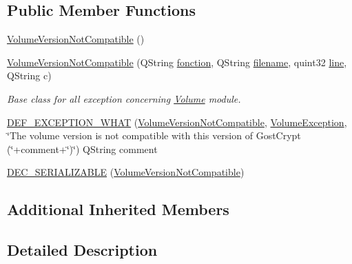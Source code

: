 \subsection*{Public Member Functions}
\begin{DoxyCompactItemize}
\item 
\hyperlink{class_gost_crypt_1_1_volume_1_1_volume_version_not_compatible_a89003c4e2f124de9c533203f30399028}{Volume\+Version\+Not\+Compatible} ()
\item 
\hyperlink{class_gost_crypt_1_1_volume_1_1_volume_version_not_compatible_a7779b958945f34a6e46d9414425c63c6}{Volume\+Version\+Not\+Compatible} (Q\+String \hyperlink{class_gost_crypt_1_1_gost_crypt_exception_a29b8c93d5efbb1ff369107385725a939}{fonction}, Q\+String \hyperlink{class_gost_crypt_1_1_gost_crypt_exception_a749a12375f4ba9d502623b99d8252f38}{filename}, quint32 \hyperlink{class_gost_crypt_1_1_gost_crypt_exception_abf506d911f12a4e969eea500f90bd32c}{line}, Q\+String c)
\begin{DoxyCompactList}\small\item\em Base class for all exception concerning \hyperlink{class_gost_crypt_1_1_volume_1_1_volume}{Volume} module. \end{DoxyCompactList}\item 
\hyperlink{class_gost_crypt_1_1_volume_1_1_volume_version_not_compatible_a2a996c66974887bd046e5d14ab7e0ab8}{D\+E\+F\+\_\+\+E\+X\+C\+E\+P\+T\+I\+O\+N\+\_\+\+W\+H\+AT} (\hyperlink{class_gost_crypt_1_1_volume_1_1_volume_version_not_compatible}{Volume\+Version\+Not\+Compatible}, \hyperlink{class_gost_crypt_1_1_volume_1_1_volume_exception}{Volume\+Exception}, \char`\"{}The volume version is not compatible with this version of Gost\+Crypt (\char`\"{}+comment+\char`\"{})\char`\"{}) Q\+String comment
\item 
\hyperlink{class_gost_crypt_1_1_volume_1_1_volume_version_not_compatible_a37724733d1f9cfd06a63dc5da101b666}{D\+E\+C\+\_\+\+S\+E\+R\+I\+A\+L\+I\+Z\+A\+B\+LE} (\hyperlink{class_gost_crypt_1_1_volume_1_1_volume_version_not_compatible}{Volume\+Version\+Not\+Compatible})
\end{DoxyCompactItemize}
\subsection*{Additional Inherited Members}


\subsection{Detailed Description}


